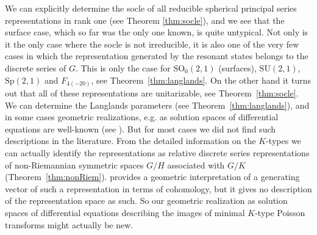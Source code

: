 \documentclass[JEP,XML,SOM,NoFloatCountersInSection,Unicode,published]{cedram}
\theoremstyle{definition}
\begin{document}
We can explicitly determine the socle of all reducible spherical principal series \hbox{representations} in rank one (see Theorem \ref{thm:socle}), and we see that the surface case, which so far was the only one known, is quite untypical. Not only is it the only case where the socle is not irreducible, it is also one of the very few cases in which the representation generated by the resonant states belongs to the discrete series of $G$. This is only the case for $\mathrm{SO}_0(2,1)$ (surfaces), $\mathrm{SU}(2,1)$, $\mathrm{Sp}(2,1)$ and $F_{4(-20)}$, see Theorem~\ref{thm:langlands}. On the other hand it turns out that all of these representations are unitarizable, see Theorem~\ref{thm:socle}. We can determine the Langlands parameters (see Theorem~\ref{thm:langlands}), and in some cases geometric realizations, e.g. as solution spaces of differential equations are well-known (see \cite{Ol,G88}). But for most cases we did not find such descrip\-tions in the literature. From the detailed information on the $K$-types we can actually identify the representations as relative discrete series representations of non-Riemannian symmetric spaces $G/H$ associated with $G/K$ (Theorem~\ref{thm:nonRiem}). \cite{TW89} provides a geometric interpretation of a generating vector of such a representation in terms of cohomology, but it gives no description of the representation space as such. So our geometric realization as solution spaces of differential equations describing the images of minimal $K$-type Poisson transforms might actually be new.
\end{document}
